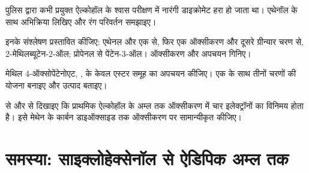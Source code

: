 \begin{exercise}[$\star\star$]\label{exo:b1:organic-redox:9}
पुलिस द्वारा कभी प्रयुक्त ऐल्कोहॉल के श्वास परीक्षण में नारंगी डाइक्रोमेट
हरा हो जाता था। एथेनॉल के साथ अभिक्रिया लिखिए और रंग
परिवर्तन समझाइए।
\end{exercise}

\begin{exercise}[$\star\star\star$]\label{exo:b1:organic-redox:10}
इनके संश्लेषण प्रस्तावित कीजिए: एथेनल और एक  से, फिर एक ऑक्सीकरण और दूसरे ग्रीन्यार चरण से, 2-मेथिलब्यूटेन-2-ऑल; प्रोपेनल से
पेंटेन-3-ऑल। ऑक्सीकरण और अपचयन गिनिए।
\end{exercise}

\begin{exercise}[$\star\star\star$]\label{exo:b1:organic-redox:11}
मेथिल 4-ऑक्सोपेंटेनोएट, , के केवल एस्टर समूह का अपचयन कीजिए।
एक  के साथ तीनों चरणों की योजना बनाइए और
उत्पाद बताइए।
\end{exercise}

\begin{exercise}[$\star\star\star$]\label{exo:b1:organic-redox:12}
 से और  से दिखाइए कि प्राथमिक ऐल्कोहॉल के अम्ल तक ऑक्सीकरण में चार
इलेक्ट्रॉनों का विनिमय होता है। इसे मेथेन के कार्बन डाइऑक्साइड तक ऑक्सीकरण पर सामान्यीकृत कीजिए।
\end{exercise}

\section{समस्या: साइक्लोहेक्सेनॉल से ऐडिपिक अम्ल तक}

